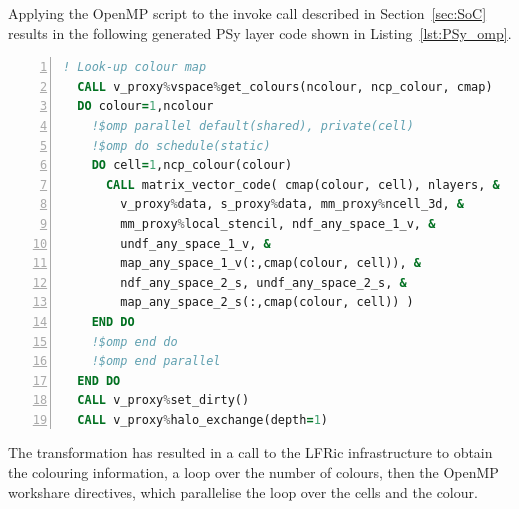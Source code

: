 \documentclass[review,times]{elsarticle}
\begin{document}
%
%
%
%

Applying the OpenMP script to the invoke call described in
Section~\ref{sec:SoC} results in the following generated PSy layer
code shown in Listing~\ref{lst:PSy_omp}. 
\begin{lstlisting}[language=Fortran, numbers=left,caption={Code 
fragment of the generated PSy layer},label={lst:PSy_omp}]
  ! Look-up colour map
  CALL v_proxy%vspace%get_colours(ncolour, ncp_colour, cmap)
  DO colour=1,ncolour
    !$omp parallel default(shared), private(cell)
    !$omp do schedule(static)
    DO cell=1,ncp_colour(colour)
      CALL matrix_vector_code( cmap(colour, cell), nlayers, &
        v_proxy%data, s_proxy%data, mm_proxy%ncell_3d, & 
        mm_proxy%local_stencil, ndf_any_space_1_v, &
        undf_any_space_1_v, &
        map_any_space_1_v(:,cmap(colour, cell)), &
        ndf_any_space_2_s, undf_any_space_2_s, &
        map_any_space_2_s(:,cmap(colour, cell)) )
    END DO 
    !$omp end do
    !$omp end parallel
  END DO 
  CALL v_proxy%set_dirty()
  CALL v_proxy%halo_exchange(depth=1)
\end{lstlisting}
The transformation has resulted in a call to the LFRic infrastructure
to obtain the colouring information, a loop over the number of
colours, then the OpenMP workshare directives, which parallelise the
loop over the cells and the colour.
\end{document}
